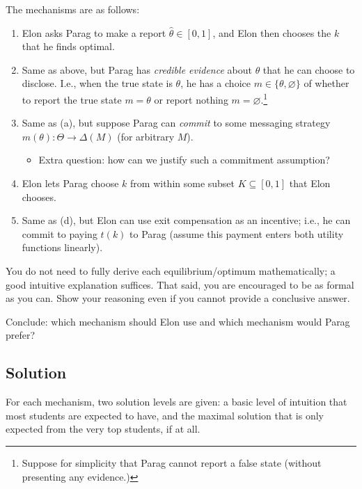 \documentclass[a4paper]{article}
\newif\ifsolutions
\begin{document}
The mechanisms are as follows:
\begin{enumerate}[label={(\alph{enumi})}]
	\item Elon asks Parag to make a report $\hat{\theta} \in [0,1]$, and Elon then chooses the $k$ that he finds optimal.
	
	\item Same as above, but Parag has \emph{credible evidence} about $\theta$ that he can choose to disclose. I.e., when the true state is $\theta$, he has a choice $m \in \{\theta,\varnothing\}$ of whether to report the true state $m=\theta$ or report nothing $m=\varnothing$.\footnote{Suppose for simplicity that Parag cannot report a false state (without presenting any evidence.)}
	
	\item Same as (a), but suppose Parag can \emph{commit} to some messaging strategy $m(\theta): \Theta \to \varDelta(M)$ (for arbitrary $M$).
	\begin{itemize}
		\item Extra question: how can we justify such a commitment assumption?
	\end{itemize}
	
	\item Elon lets Parag choose $k$ from within some subset $K \subseteq [0,1]$ that Elon chooses.
	
	\item Same as (d), but Elon can use exit compensation as an incentive; i.e., he can commit to paying $t(k)$ to Parag (assume this payment enters both utility functions linearly).
\end{enumerate}
You do not need to fully derive each equilibrium/optimum mathematically; a good intuitive explanation suffices. That said, you are encouraged to be as formal as you can. Show your reasoning even if you cannot provide a conclusive answer.

Conclude: which mechanism should Elon use and which mechanism would Parag prefer?



\ifsolutions
\subsection*{Solution}

For each mechanism, two solution levels are given: a basic level of intuition that most students are expected to have, and the maximal solution that is only expected from the very top students, if at all.
\end{document}
